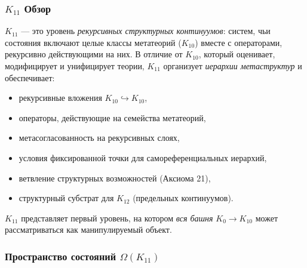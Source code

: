 

\subsubsection{$K_{11}$ Обзор}
\label{sec:k11-overview}

$K_{11}$ — это уровень \emph{рекурсивных структурных континуумов}: систем, чьи
состояния включают целые классы метатеорий ($K_{10}$) вместе с
операторами, рекурсивно действующими на них. В отличие от $K_{10}$, который оценивает,
модифицирует и унифицирует теории, $K_{11}$ организует \emph{иерархии
метаструктур} и обеспечивает:
\begin{itemize}
    \item рекурсивные вложения $K_{10}\hookrightarrow K_{10}$,
    \item операторы, действующие на семейства метатеорий,
    \item метасогласованность на рекурсивных слоях,
    \item условия фиксированной точки для самореференциальных иерархий,
    \item ветвление структурных возможностей (Аксиома 21),
    \item структурный субстрат для $K_{12}$ (предельных континуумов).
\end{itemize}

$K_{11}$ представляет первый уровень, на котором \emph{вся башня} $K_0 \to K_{10}$
может рассматриваться как манипулируемый объект.

\subsubsection{Пространство состояний $\Omega(K_{11})$}

